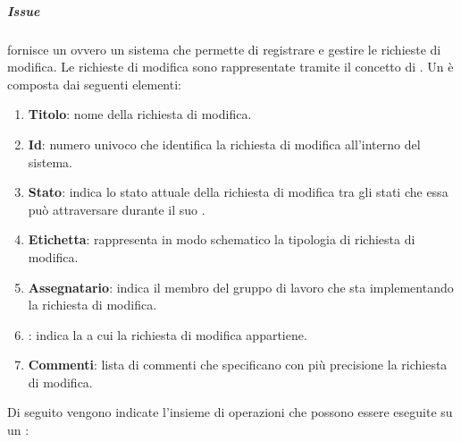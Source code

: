 \subparagraph{Issue}
\label{subpar:ITS}
 fornisce un  ovvero un sistema che permette di registrare e gestire le richieste di modifica.
Le richieste di modifica sono rappresentate tramite il concetto di \textbf{}.
Un  è composta dai seguenti elementi:
\begin{enumerate}
    \item \textbf{Titolo}: nome della richiesta di modifica.
    
    \item \textbf{Id}: numero univoco che identifica la richiesta di modifica all'interno del sistema.
    
    \item \textbf{Stato}: indica lo stato attuale della richiesta di modifica tra gli stati che essa può attraversare durante il suo .
    
    \item \textbf{Etichetta}: rappresenta in modo schematico la tipologia di richiesta di modifica.
    
    \item \textbf{Assegnatario}: indica il membro del gruppo di lavoro che sta implementando la richiesta di modifica.
    
    \item \textbf{}: indica la  a cui la richiesta di modifica appartiene.
    
    \item \textbf{Commenti}: lista di commenti che specificano con più precisione la richiesta di modifica. 
\end{enumerate}
Di seguito vengono indicate l'insieme di operazioni che possono essere eseguite su un :

